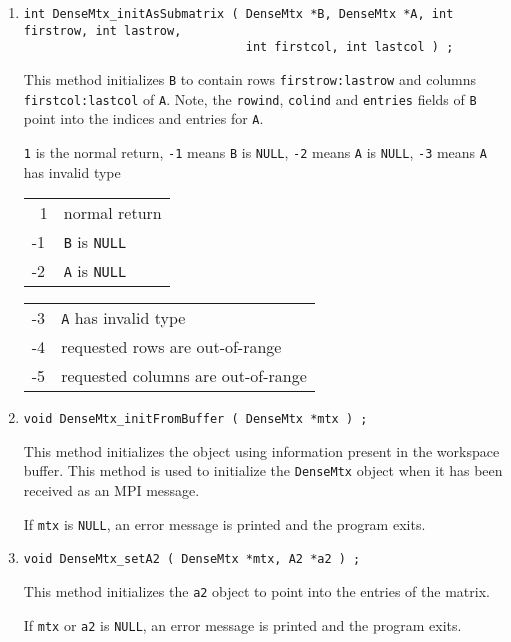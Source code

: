 \begin{enumerate}
\item
\begin{verbatim}
int DenseMtx_initAsSubmatrix ( DenseMtx *B, DenseMtx *A, int firstrow, int lastrow,
                               int firstcol, int lastcol ) ;
\end{verbatim}
This method initializes {\tt B} to contain rows {\tt firstrow:lastrow} 
and columns {\tt firstcol:lastcol} of {\tt A}.
Note, the {\tt rowind}, {\tt colind} and {\tt entries} fields of
{\tt B} point into the indices and entries for {\tt A}.
\par {}
{\tt 1} is the normal return,
{\tt -1} means {\tt B} is {\tt NULL},
{\tt -2} means {\tt A} is {\tt NULL},
{\tt -3} means {\tt A} has invalid type
\begin{center}
\begin{tabular}{ll}
~1 & normal return \\
-1 & {\tt B} is {\tt NULL} \\
-2 & {\tt A} is {\tt NULL}
\end{tabular}
\begin{tabular}{ll}
-3 & {\tt A} has invalid type \\
-4 & requested rows are out-of-range \\
-5 & requested columns are out-of-range
\end{tabular}
\end{center}
\item
\begin{verbatim}
void DenseMtx_initFromBuffer ( DenseMtx *mtx ) ;
\end{verbatim}
This method initializes the object using information present in the
workspace buffer.
This method is used to initialize the {\tt DenseMtx} object when
it has been received as an MPI message.
\par {}
If {\tt mtx} is {\tt NULL},
an error message is printed and the program exits.
\item
\begin{verbatim}
void DenseMtx_setA2 ( DenseMtx *mtx, A2 *a2 ) ;
\end{verbatim}
This method initializes the {\tt a2} object to point
into the entries of the matrix.
\par {}
If {\tt mtx} or {\tt a2} is {\tt NULL},
an error message is printed and the program exits.
\end{enumerate}
\par
